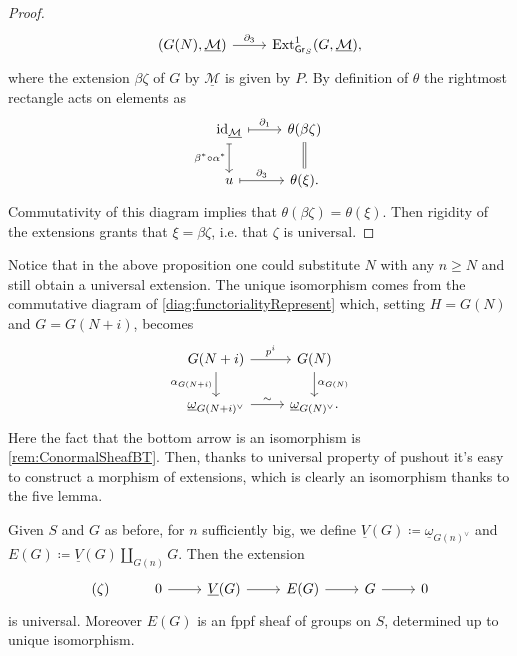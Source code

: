 \begin{proof}
\begin{equation*}
\begin{tikzcd}
		\left( G(N), \underline{\mathcal{M}} \right) 
		\arrow[r, "\partial_3", rightarrow] &
		\mathrm{Ext}^1_{\mathsf{Gr}_S}
		(G,\underline{\mathcal{M}})
	,\end{tikzcd}
	\end{equation*}
	where the extension $\beta\zeta$ of $G$ by $\underline{\mathcal{M}}$ is given by $P$.
	By definition of $\theta$ the rightmost rectangle acts on elements as
	\begin{equation*}
	\begin{tikzcd}
		\mathrm{id}_{ \underline{\mathcal{M}} }
		\arrow[r, "\partial_1", mapsto] 
		\arrow[d, "\beta^* \circ \alpha^*"', mapsto] &
		\theta(\beta\zeta)
		\arrow[d, "", equal] \\
		u \arrow[r, "\partial_3", mapsto] &
		\theta(\xi)
	.\end{tikzcd}
	\end{equation*}
	Commutativity of this diagram implies that $\theta(\beta\zeta) = \theta(\xi)$.
	Then rigidity of the extensions grants that $\xi = \beta\zeta$, i.e.
	that $\zeta$ is universal.
\end{proof}


\begin{rem}
	Notice that in the above proposition one could substitute
	$N$ with any $n \geq N$ and still obtain a universal extension.
	The unique isomorphism comes from the commutative diagram
	of \cref{diag:functorialityRepresent}
	which, setting $H = G(N)$ and $G = G(N+i)$, becomes
	\begin{equation*}
	\begin{tikzcd}
		G(N+i) \arrow[r, "p^i", rightarrow] 
		\arrow[d, "\alpha_{G(N+i)}"', rightarrow] &
		G(N) \arrow[d, "\alpha_{G(N)}", rightarrow] \\
		\underline{\omega}_{G(N+i)^\vee} \arrow[r, "\sim", rightarrow] &
		\underline{\omega}_{G(N)^\vee}
	.\end{tikzcd}
	\end{equation*}
	Here the fact that the bottom arrow is an isomorphism
	is \cref{rem:ConormalSheafBT}.
	Then, thanks to universal property of pushout it's easy to construct
	a morphism of extensions, which is clearly an isomorphism
	thanks to the five lemma.
\end{rem}


\begin{defn}[]
	Given $S$ and $G$ as before, for $n$ sufficiently big, we define
	$\underline{V}(G) \coloneqq \underline{\omega}_{G(n)^\vee}$ and
	$E(G) \coloneqq \underline{V}(G) \amalg_{G(n)} G$.
	Then the extension
	\begin{equation*}
	\begin{tikzcd}
		(\zeta) &
		0 \arrow[r, "", rightarrow] &
		\underline{V}(G) \arrow[r, "", rightarrow] &
		E(G) \arrow[r, "", rightarrow] &
		G \arrow[r, "", rightarrow] &
		0
	\end{tikzcd}
	\end{equation*}
	is universal.
	Moreover $E(G)$ is an fppf sheaf of groups on $S$,
	determined up to unique isomorphism.
\end{defn}


